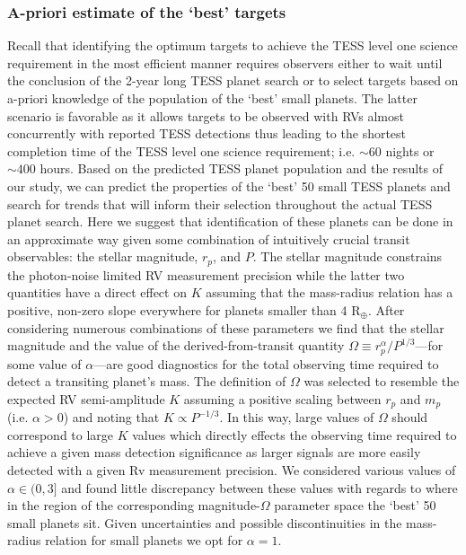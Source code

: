 \subsubsection{A-priori estimate of the `best' targets}
Recall that identifying the optimum targets to achieve the TESS level one
science requirement in the most efficient
manner requires observers either to wait until the conclusion of the 2-year long TESS planet search
or to select targets based on a-priori knowledge of the population of the `best' small planets.
The latter scenario is favorable
as it allows targets to be observed with RVs almost concurrently with reported TESS detections thus
leading to the shortest completion time of the TESS level one science requirement; i.e. $\sim 60$
nights or $\sim 400$ hours.
Based on the predicted TESS planet population  and the results of our study,
we can predict the properties of the `best' 50 small TESS planets and search for trends that will inform
their selection throughout the actual TESS planet search. 
Here we suggest that identification of these planets can be done in an approximate way
given some combination of intuitively crucial transit observables: the stellar magnitude, $r_p$, and $P$.
The stellar magnitude constrains the photon-noise limited RV measurement precision while the latter two
quantities have a direct effect on $K$ assuming that the mass-radius relation has a positive, non-zero slope
everywhere for planets
smaller than 4 R$_{\oplus}$. After considering numerous combinations of these parameters we find that the
stellar magnitude and the value of the derived-from-transit
quantity $\Omega \equiv r_p^{\alpha}/P^{1/3}$---for some value of $\alpha$---are
good diagnostics for the total observing time required to detect a transiting planet's mass. The
definition of $\Omega$ was selected to resemble the expected RV semi-amplitude $K$ assuming a
positive scaling between $r_p$ and $m_p$ (i.e. $\alpha > 0$) and noting that $K \propto P^{-1/3}$.
In this way, large values of $\Omega$ should correspond to large $K$ values which directly effects the observing
time required to achieve a given mass detection significance as larger signals are more easily detected with
a given Rv measurement precision. We considered various values of $\alpha \in (0,3]$
and found little discrepancy between these values with regards to where in the region of the corresponding
magnitude-$\Omega$ parameter space the `best' 50 small planets sit. Given uncertainties and possible discontinuities
in the mass-radius relation for small planets we opt for $\alpha =1$.


